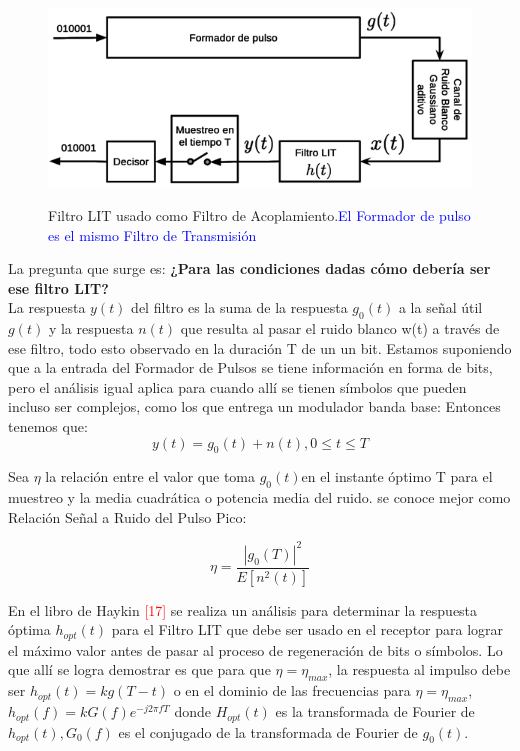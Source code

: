 \begin{figure}[h!]
	\captionsetup{justification = raggedright, singlelinecheck = false}
	\caption{Filtro LIT usado como Filtro de Acoplamiento.\textcolor{blue}{El Formador de pulso es el mismo Filtro de Transmisión} } 
	\centering
	\includegraphics[scale=1]{Imagenes/Filtro.png}
	\label{fig:Filtro}
\end{figure}

La pregunta que surge es: \textbf{¿Para las condiciones dadas cómo debería ser ese filtro LIT? }\\ 

La respuesta $y(t)$ del filtro es la suma de la respuesta $g_0 (t)$ a la señal útil $g(t)$ y la respuesta $n(t)$ que resulta al pasar el ruido blanco w(t) a través de ese filtro, todo esto observado en la duración T de un un bit. Estamos suponiendo que a la entrada del Formador de Pulsos se tiene información en forma de bits, pero el análisis igual aplica para cuando allí se tienen símbolos que pueden incluso ser complejos, como los que entrega un modulador banda base: Entonces tenemos que: \\

\begin{equation} \label{capcuatro_veintitres}
	 y(t) = g_{0}(t) + n(t), 0  \leq t \leq  T  
\end{equation}

Sea $ \eta $ la relación entre el valor que toma $g_{0}(t)$en el instante óptimo T para el muestreo y la media cuadrática o potencia media del ruido.  se conoce mejor como Relación Señal a Ruido del Pulso Pico:

\begin{equation} \label{capcuatro_veinticuatro}
	 \eta = \dfrac{|g_{0}(T)|^{2}}{E[n^{2}(t)]} 
\end{equation}

En el libro de Haykin  \textcolor{Red}{[17]} se realiza un análisis para determinar la respuesta óptima $ h_{opt}(t) $ para el Filtro LIT que debe ser usado en el receptor para lograr el máximo valor   antes de pasar al proceso de regeneración de bits o símbolos. Lo que allí se logra demostrar es que para que  $ \eta = \eta_{max} $, la respuesta al impulso debe ser $ h_{opt}(t) = kg (T-t) $ o en el dominio de las frecuencias para $ \eta = \eta_{max} $,  $ h_{opt}(f) = kG(f)e^{-j2\pi fT} $ donde $ H_{opt}(t)$ es la transformada de Fourier de $ h_{opt}(t), G_{0}(f)$ es el conjugado de la transformada de Fourier de $g_{0}(t) $.

